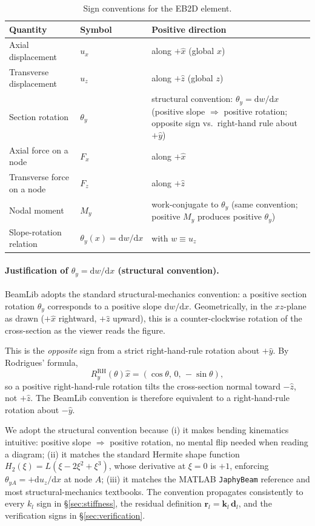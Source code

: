 \documentclass[11pt,a4paper]{article}
\newcommand{\dd}{\mathrm{d}}
\newcommand{\bmath}[1]{\boldsymbol{#1}}
\begin{document}
\begin{table}[h!]
\centering
\begin{tabular}{l l l}
\toprule
Quantity & Symbol & Positive direction \\
\midrule
Axial displacement & $u_x$ & along $+\hat{x}$ (global $x$) \\
Transverse displacement & $u_z$ & along $+\hat{z}$ (global $z$) \\
Section rotation & $\theta_y$ & structural convention: $\theta_y = \dd w/\dd x$ (positive slope $\Rightarrow$ positive rotation; opposite sign vs.\ right-hand rule about $+\hat{y}$) \\
Axial force on a node & $F_x$ & along $+\hat{x}$ \\
Transverse force on a node & $F_z$ & along $+\hat{z}$ \\
Nodal moment & $M_y$ & work-conjugate to $\theta_y$ (same convention; positive $M_y$ produces positive $\theta_y$) \\
Slope-rotation relation & $\theta_y(x) = \dd w/\dd x$ & with $w \equiv u_z$ \\
\bottomrule
\end{tabular}
\caption{Sign conventions for the EB2D element.}
\end{table}

\paragraph{Justification of $\theta_y = \dd w / \dd x$ (structural convention).}\label{sec:thetay-justification}
BeamLib adopts the standard structural-mechanics convention: a positive section rotation $\theta_y$ corresponds to a positive slope $\dd w / \dd x$. Geometrically, in the $xz$-plane as drawn ($+\hat{x}$ rightward, $+\hat{z}$ upward), this is a counter-clockwise rotation of the cross-section as the viewer reads the figure.

This is the \emph{opposite} sign from a strict right-hand-rule rotation about $+\hat{y}$. By Rodrigues' formula,
\[
R_y^{\mathrm{RH}}(\theta)\hat{x} = (\cos\theta,\,0,\,-\sin\theta),
\]
so a positive right-hand-rule rotation tilts the cross-section normal toward $-\hat{z}$, not $+\hat{z}$. The BeamLib convention is therefore equivalent to a right-hand-rule rotation about $-\hat{y}$.

We adopt the structural convention because (i) it makes bending kinematics intuitive: positive slope $\Rightarrow$ positive rotation, no mental flip needed when reading a diagram; (ii) it matches the standard Hermite shape function $H_2(\xi) = L(\xi - 2\xi^2 + \xi^3)$, whose derivative at $\xi=0$ is $+1$, enforcing $\theta_{yA} = +\dd u_z/\dd x$ at node $A$; (iii) it matches the MATLAB \texttt{JaphyBeam} reference and most structural-mechanics textbooks. The convention propagates consistently to every $k_l$ sign in \S\ref{sec:stiffness}, the residual definition $\bmath{r}_l = \bmath{k}_l\,\bmath{d}_l$, and the verification signs in \S\ref{sec:verification}.
\end{document}

